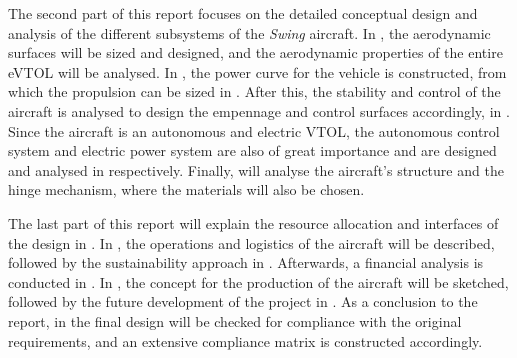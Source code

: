 The second part of this report focuses on the detailed conceptual design and analysis of the different subsystems of the \textit{Swing} aircraft.
In , the aerodynamic surfaces will be sized and designed, and the aerodynamic properties of the entire eVTOL will be analysed.
In , the power curve for the vehicle is constructed, from which the propulsion can be sized in .
After this, the stability and control of the aircraft is analysed to design the empennage and control surfaces accordingly, in .
Since the aircraft is an autonomous and electric VTOL, the autonomous control system and electric power system are also of great importance and are designed and analysed in  respectively.
Finally,  will analyse the aircraft’s structure and the hinge mechanism, where the materials will also be chosen.

The last part of this report will explain the resource allocation and interfaces of the design in .
In , the operations and logistics of the aircraft will be described, followed by the sustainability approach in .
Afterwards, a financial analysis is conducted in .
In , the concept for the production of the aircraft will be sketched, followed by the future development of the project in .
As a conclusion to the report, in  the final design will be checked for compliance with the original requirements, and an extensive compliance matrix is constructed accordingly.